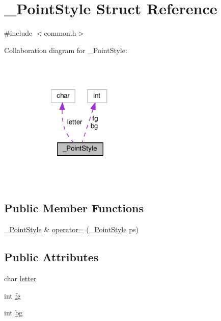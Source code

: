 \hypertarget{struct___point_style}{\section{\-\_\-\-Point\-Style Struct Reference}
\label{struct___point_style}
}


{\ttfamily \#include $<$common.\-h$>$}



Collaboration diagram for \-\_\-\-Point\-Style\-:
\nopagebreak
\begin{figure}[H]
\begin{center}
\leavevmode
\includegraphics[width=161pt]{struct___point_style__coll__graph}
\end{center}
\end{figure}
\subsection*{Public Member Functions}
\begin{DoxyCompactItemize}
\item 
\hyperlink{struct___point_style}{\-\_\-\-Point\-Style} \& \hyperlink{struct___point_style_a1928e8b7e2cf5588abbccf6774bd1714}{operator=} (\hyperlink{struct___point_style}{\-\_\-\-Point\-Style} ps)
\end{DoxyCompactItemize}
\subsection*{Public Attributes}
\begin{DoxyCompactItemize}
\item 
char \hyperlink{struct___point_style_aa4cf23b21f61b08b05ff90b37fb26bc8}{letter}
\item 
int \hyperlink{struct___point_style_aad357bccd6e6759fc8575d3354d2bc7b}{fg}
\item 
int \hyperlink{struct___point_style_a0f1cb3b870284fd00ca8bdc2cbb782ca}{bg}
\end{DoxyCompactItemize}


